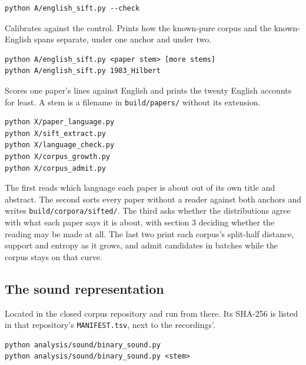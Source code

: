 \begin{lstlisting}[breaklines=true,breakatwhitespace=false,basicstyle=\ttfamily\small]
python A/english_sift.py --check
\end{lstlisting}

Calibrates against the control. Prints how the known-pure corpus and the known-English spans separate, under one anchor and under two.

\begin{lstlisting}[breaklines=true,breakatwhitespace=false,basicstyle=\ttfamily\small]
python A/english_sift.py <paper stem> [more stems]
python A/english_sift.py 1983_Hilbert
\end{lstlisting}

Scores one paper's lines against English and prints the twenty English accounts for least. A stem is a filename in \texttt{build/\allowbreak{}papers/\allowbreak{}} without its extension.

\begin{lstlisting}[breaklines=true,breakatwhitespace=false,basicstyle=\ttfamily\small]
python X/paper_language.py
python X/sift_extract.py
python X/language_check.py
python X/corpus_growth.py
python X/corpus_admit.py
\end{lstlisting}

The first reads which language each paper is about out of its own title and abstract. The second sorts every paper without a reader against both anchors and writes \texttt{build/\allowbreak{}corpora/\allowbreak{}sifted/\allowbreak{}}. The third asks whether the distributions agree with what each paper says it is about, with section 3 deciding whether the reading may be made at all. The last two print each corpus's split-half distance, support and entropy as it grows, and admit candidates in batches while the corpus stays on that curve.

\subsection{The sound representation}

Located in the closed corpus repository and run from there. Its SHA-256 is listed in that repository's \texttt{MANIFEST.\allowbreak{}tsv}, next to the recordings'.

\begin{lstlisting}[breaklines=true,breakatwhitespace=false,basicstyle=\ttfamily\small]
python analysis/sound/binary_sound.py
python analysis/sound/binary_sound.py <stem>
\end{lstlisting}


